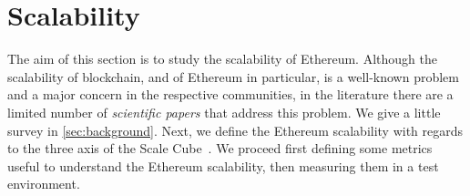 \section{Scalability}
\label{sec:scalability}
The aim of this section is to study the scalability of Ethereum. Although the
scalability of blockchain, and of Ethereum in particular, is a well-known
problem and a major concern in the respective communities, in the literature
there are a limited number of \emph{scientific papers} that address this
problem. We give a little survey in \autoref{sec:background}. Next, we define
the Ethereum scalability with regards to the three axis of the Scale
Cube~\cite{bib:art-of-scalability}. We proceed first defining some metrics
useful to understand the Ethereum scalability, then measuring them in a test
environment.
